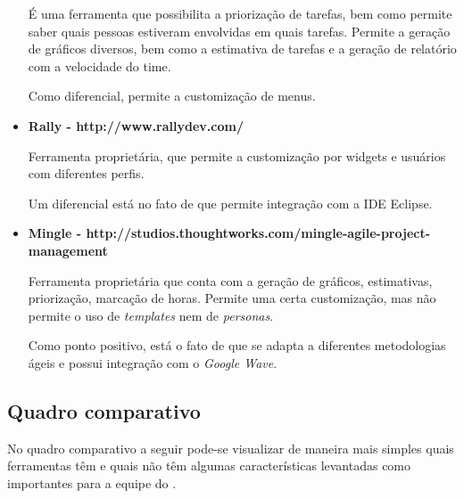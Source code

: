 \begin{itemize}
{É uma ferramenta \opensource{} que possibilita a priorização de tarefas, bem como permite saber quais pessoas estiveram envolvidas em quais tarefas. Permite a geração de gráficos diversos, bem como a estimativa de tarefas e a geração de relatório com a velocidade do time. 

Como diferencial, permite a customização de menus.}

\item{\textbf{Rally - http://www.rallydev.com/}

Ferramenta proprietária, que permite a customização por widgets e usuários com diferentes perfis. 

Um diferencial está no fato de que permite integração com a IDE Eclipse.}

\item{\textbf{Mingle - http://studios.thoughtworks.com/mingle-agile-project-management}

Ferramenta proprietária que conta com a geração de gráficos, estimativas, priorização, marcação de horas. Permite uma certa customização, mas não permite o uso de \textit{templates} nem de \textit{personas}. 

Como ponto positivo, está o fato de que se adapta a diferentes metodologias ágeis e possui integração com o \textit{Google Wave}.}

\end{itemize}

\subsection{Quadro comparativo}

No quadro comparativo a seguir pode-se visualizar de maneira mais simples quais ferramentas têm e quais não têm algumas características levantadas como importantes para a equipe do \calopsita{}. 

